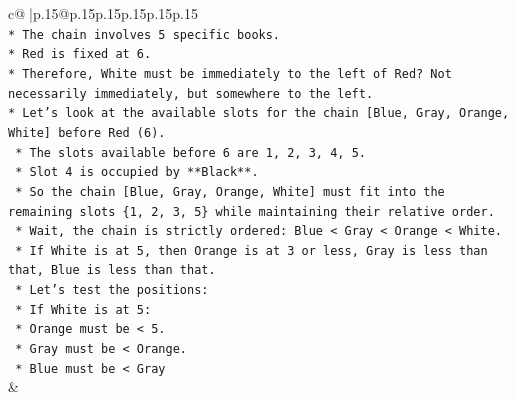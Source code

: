 \documentclass{article}
\begin{document}
{\begin{supertabular}{c@{$\;$}|p{.15\linewidth}@{}p{.15\linewidth}p{.15\linewidth}p{.15\linewidth}p{.15\linewidth}p{.15\linewidth}}
{{{\\ 
\texttt{*   The chain involves 5 specific books.} \\
\texttt{*   Red is fixed at 6.} \\
\texttt{*   Therefore, White must be immediately to the left of Red? Not necessarily immediately, but somewhere to the left.} \\
\texttt{*   Let's look at the available slots for the chain {[}Blue, Gray, Orange, White{]} before Red (6).} \\
\texttt{    *   The slots available before 6 are 1, 2, 3, 4, 5.} \\
\texttt{    *   Slot 4 is occupied by **Black**.} \\
\texttt{    *   So the chain {[}Blue, Gray, Orange, White{]} must fit into the remaining slots \{1, 2, 3, 5\} while maintaining their relative order.} \\
\texttt{    *   Wait, the chain is strictly ordered: Blue < Gray < Orange < White.} \\
\texttt{    *   If White is at 5, then Orange is at 3 or less, Gray is less than that, Blue is less than that.} \\
\texttt{    *   Let's test the positions:} \\
\texttt{        *   If White is at 5:} \\
\texttt{            *   Orange must be < 5.} \\
\texttt{            *   Gray must be < Orange.} \\
\texttt{            *   Blue must be < Gray} \\
            }
        }
    }
    & \\ \\


\end{supertabular}}
\end{document}
